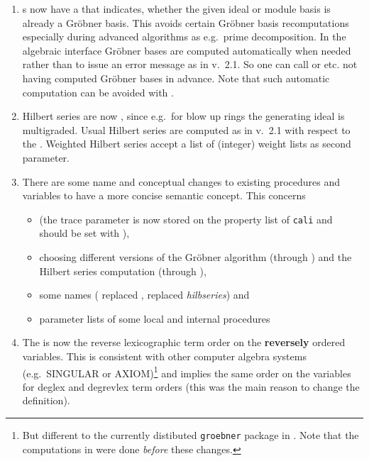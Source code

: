 \begin{enumerate}
\item {}s now have a  that indicates, whether the
given ideal or module basis is already a Gr\"obner basis. This avoids
certain Gr\"obner basis recomputations especially during advanced algorithms
as e.g.\ prime decomposition. In the algebraic interface Gr\"obner bases are
computed automatically when needed rather than to issue an error
message as in v.~2.1. So one can call  or 
etc. not having computed Gr\"obner bases in advance. Note that such
automatic computation can be avoided with .

\item Hilbert series are now , since
e.g.\ for blow up rings the generating ideal is multigraded. Usual
Hilbert series are computed as in v.~2.1 with respect to the
. Weighted Hilbert series accept a list of (integer)
weight lists as second parameter.

\item There are some name and conceptual changes to existing
procedures and variables to have a more concise semantic concept. This
concerns
\begin{itemize}
  \item
{} (the trace parameter is now stored on the property list
of \texttt{cali} and should be set with ),

\item
choosing different versions of the Gr\"obner algorithm (through
) and the Hilbert series computation (through
),

\item
some names ( replaced , 
replaced \emph{hilbseries}) and

\item
parameter lists of some local and internal procedures %
\end{itemize}

\item The  is now the reverse lexicographic
term order on the \textbf{reversely} ordered variables. This is consistent
with other computer algebra systems (e.g.\ SINGULAR or
AXIOM)\footnote{But different to the currently distibuted \texttt{groebner} package in \REDUCE. Note that the computations in
\cite{Graebe:94a} were done \emph{before} these changes.} and implies the same
order on the variables for deglex and degrevlex term orders (this was
the main reason to change the definition).


\end{enumerate}
